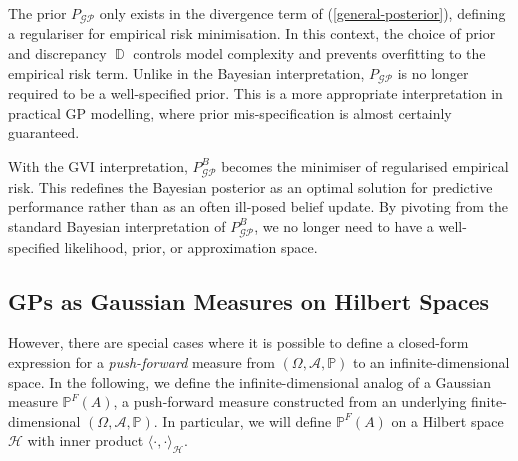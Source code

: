 \documentclass{article}
\newcommand{\D}{\operatorname{\mathbb{D}}}
\newcommand{\GP}{\operatorname{\mathcal{GP}}}
\numberwithin{equation}{section}
\begin{document}
The prior $P_{\GP}$ only exists in the divergence term of (\ref{general-posterior}), defining a regulariser for empirical risk minimisation. In this context, the choice of prior and discrepancy $\D$ controls model complexity and prevents overfitting to the empirical risk term. Unlike in the Bayesian interpretation, $P_{\GP}$ is no longer required to be a well-specified prior. This is a more appropriate interpretation in practical GP modelling, where prior mis-specification is almost certainly guaranteed.

With the GVI interpretation, $P_{\GP}^B$ becomes the minimiser of regularised empirical risk. This redefines the Bayesian posterior as an optimal solution for predictive performance rather than as an often ill-posed belief update. By pivoting from the standard Bayesian interpretation of $P_{\GP}^B$, we no longer need to have a well-specified likelihood, prior, or approximation space.

\subsection{GPs as Gaussian Measures on Hilbert Spaces}
However, there are special cases where it is possible to define a closed-form expression for a \textit{push-forward} measure from $(\Omega, \mathcal{A}, \mathbb{P})$ to an infinite-dimensional space. In the following, we define the infinite-dimensional analog of a Gaussian measure  $\mathbb{P}^{F}(A)$, a push-forward measure constructed from an underlying finite-dimensional $(\Omega, \mathcal{A}, \mathbb{P})$. In particular, we will define $\mathbb{P}^{F}(A)$ on a Hilbert space $\mathcal{H}$ with inner product $\langle \cdot, \cdot \rangle_\mathcal{H}$.
\end{document}
